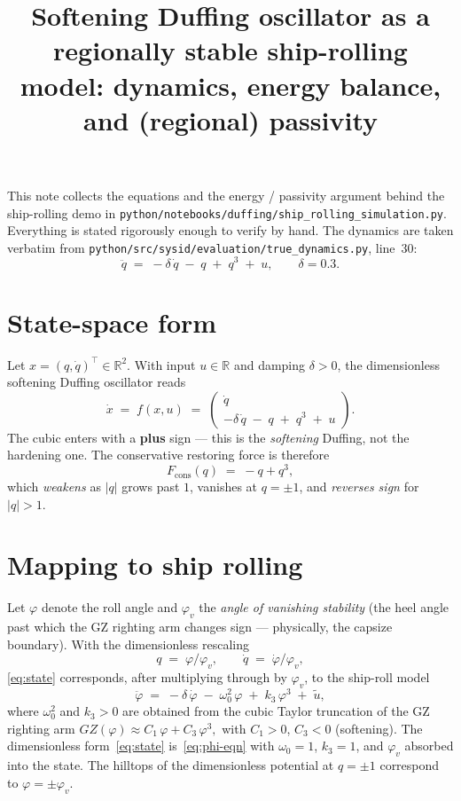 \documentclass[11pt]{article}
\title{Softening Duffing oscillator as a regionally stable ship-rolling
       model: dynamics, energy balance, and (regional) passivity}
\author{}
\date{}
\newcommand{\R}{\mathbb{R}}
\begin{document}
\maketitle

\noindent
This note collects the equations and the energy / passivity argument
behind the ship-rolling demo in
\texttt{python/notebooks/duffing/ship\_rolling\_simulation.py}.
Everything is stated rigorously enough to verify by hand. The dynamics
are taken verbatim from
\texttt{python/src/sysid/evaluation/true\_dynamics.py}, line~30:
\[
\ddot q \;=\; -\delta\,\dot q \;-\; q \;+\; q^3 \;+\; u,
\qquad \delta=0{.}3.
\]

\section{State-space form}

Let $x = (q, \dot q)^\top \in \R^2$. With input $u\in\R$ and damping
$\delta > 0$, the dimensionless softening Duffing oscillator reads
\begin{equation}
\dot x
  \;=\; f(x, u)
  \;=\;
  \begin{pmatrix} \dot q \\[2pt]
                  -\delta\,\dot q \;-\; q \;+\; q^3 \;+\; u
  \end{pmatrix}.
\label{eq:state}
\end{equation}
The cubic enters with a {\bfseries plus} sign --- this is the
{\itshape softening} Duffing, not the hardening one. The conservative
restoring force is therefore
\begin{equation}
F_{\mathrm{cons}}(q) \;=\; -q + q^3,
\label{eq:Fcons}
\end{equation}
which {\itshape weakens} as $|q|$ grows past $1$, vanishes at
$q=\pm 1$, and {\itshape reverses sign} for $|q|>1$.

\section{Mapping to ship rolling}

Let $\varphi$ denote the roll angle and $\varphi_v$ the
\emph{angle of vanishing stability} (the heel angle past which the GZ
righting arm changes sign --- physically, the capsize boundary). With
the dimensionless rescaling
\begin{equation}
q \;=\; \varphi / \varphi_v,
\qquad
\dot q \;=\; \dot\varphi / \varphi_v,
\label{eq:rescale}
\end{equation}
\eqref{eq:state} corresponds, after multiplying through by $\varphi_v$,
to the ship-roll model
\begin{equation}
\ddot\varphi
  \;=\; -\delta\,\dot\varphi
        \;-\; \omega_0^2\,\varphi
        \;+\; k_3\,\varphi^3
        \;+\; \tilde u,
\label{eq:phi-eqn}
\end{equation}
where $\omega_0^2$ and $k_3>0$ are obtained from the cubic
Taylor truncation of the GZ righting arm
\(
GZ(\varphi) \approx C_1\,\varphi + C_3\,\varphi^3,
\)
with $C_1>0$, $C_3<0$ (softening). The dimensionless
form~\eqref{eq:state} is~\eqref{eq:phi-eqn} with $\omega_0=1$, $k_3=1$,
and $\varphi_v$ absorbed into the state. The hilltops of the
dimensionless potential at $q=\pm 1$ correspond to
$\varphi = \pm \varphi_v$.
\end{document}

